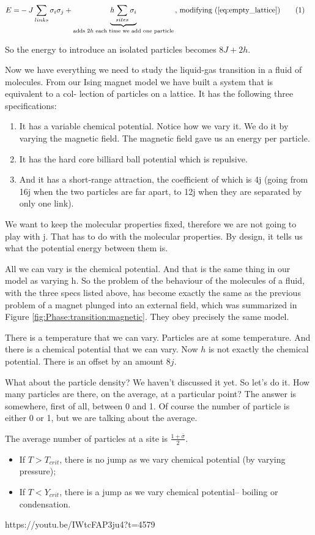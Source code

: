 \documentclass[]{article}
\newcommand\numberthis{\addtocounter{equation}{1}\tag{\theequation}}
\begin{document}
\begin{align*}
 	E =& -J \sum_{links} \sigma_i \sigma_j + \underbrace{ h \sum_{sites}\sigma_i}_\text{adds $2h$ each time we add one particle} \text{, modifying (\ref{eq:empty_lattice})} \numberthis\label{eq:lattice:chem:potential}
\end{align*}

So the energy to introduce an isolated particles becomes $8J+2h$.

Now we have everything we need to study the liquid-gas
transition in a fluid of molecules. From our Ising magnet
model we have built a system that is equivalent to a col-
lection of particles on a lattice. It has the following three
specifications:
\begin{enumerate}
	\item It has a variable chemical potential. Notice how we
	vary it. We do it by varying the magnetic field. The
	magnetic field gave us an energy per particle.
	\item It has the hard core billiard ball potential which is
	repulsive.
	\item And it has a short-range attraction, the coefficient of
	which is 4j (going from 16j when the two particles
	are far apart, to 12j when they are separated by only
	one link).
\end{enumerate}

We want to keep the molecular properties fixed, therefore
we are not going to play with j. That has to do with the
molecular properties. By design, it tells us what the potential energy between them is.

All we can vary is the chemical potential. And that is the
same thing in our model as varying h.
So the problem of the behaviour of the molecules of a fluid,
with the three specs listed above, has become exactly the
same as the previous problem of a magnet plunged into an
external field, which was summarized in Figure \ref{fig:Phase:transition:magnetic}. They
obey precisely the same model.

There is a temperature that we can vary. Particles are at
some temperature. And there is a chemical potential that
we can vary. Now $h$ is not exactly the chemical potential.
There is an offset by an amount $8j$.

What about the particle density? We haven’t discussed it
yet. So let’s do it. How many particles are there, on the
average, at a particular point? The answer is somewhere,
first of all, between 0 and 1. Of course the number of particle is either 0 or 1, but we are talking about the average.

The average number of particles at a site is $\frac{1+\bar{\sigma}}{2}$.

\begin{itemize}
	\item If $T>T_{crit}$, there is no jump as we vary chemical potential (by varying pressure);
		\item If $T<Y_{crit}$, there is a jump as we vary chemical potential-- boiling or condensation.
\end{itemize}

https://youtu.be/IWtcFAP3ju4?t=4579

\printglossaries
\end{document}
